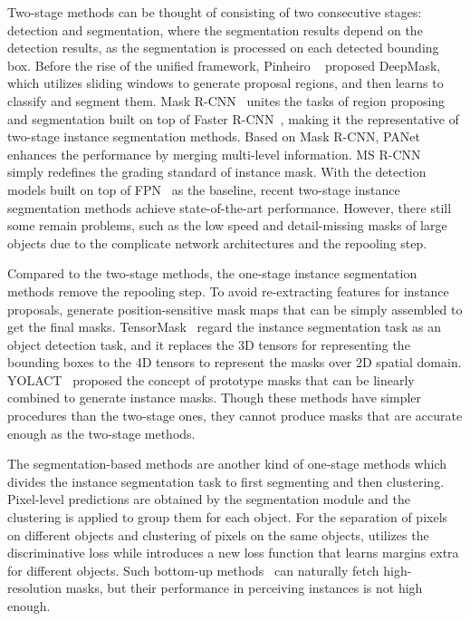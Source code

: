 \documentclass[10pt,twocolumn,letterpaper]{article}
\begin{document}
\medbreak
{} 
Two-stage methods can be thought of consisting of two consecutive stages: detection and segmentation, where the segmentation results depend on the detection results, as the segmentation is processed on each detected bounding box. 
Before the rise of the unified framework, Pinheiro \etal~\cite{pinheiro2015learning} proposed DeepMask, which utilizes sliding windows to generate proposal regions, and then learns to classify and segment them.
Mask R-CNN~\cite{he2017mask} unites the tasks of region proposing and segmentation built on top of Faster R-CNN~\cite{ren2015faster}, making it the representative of two-stage instance segmentation methods. 
Based on Mask R-CNN, PANet~\cite{liu2018path} enhances the performance by merging multi-level information. MS R-CNN~\cite{huang2019mask} simply redefines the grading standard of instance mask. 
With the detection models built on top of FPN~\cite{lin2017feature} as the baseline, recent two-stage instance segmentation methods achieve state-of-the-art performance. 
However, there still some remain problems, such as the low speed and detail-missing masks of large objects due to the complicate network architectures and the repooling step.

\medbreak
{}
Compared to the two-stage methods, the one-stage instance segmentation methods remove the repooling step. 
To avoid re-extracting features for instance proposals, \cite{dai2016instance_eccv,li2017fully} generate position-sensitive mask maps that can be simply assembled to get the final masks. 
TensorMask~\cite{chen2019tensormask} regard the instance segmentation task as an object detection task, and it replaces the 3D tensors for representing the bounding boxes to the 4D tensors to represent the masks over 2D spatial domain.
YOLACT~\cite{bolya-iccv2019} proposed the concept of prototype masks that can be linearly combined to generate instance masks. 
Though these methods have simpler procedures than the two-stage ones, they cannot produce masks that are accurate enough as the two-stage methods. 

\medbreak
{} 
The segmentation-based methods are another kind of one-stage methods which divides the instance segmentation task to first segmenting and then clustering. 
Pixel-level predictions are obtained by the segmentation module and the clustering is applied to group them for each object.
For the separation of pixels on different objects and clustering of pixels on the same objects, \cite{de2017semantic} utilizes the discriminative loss while \cite{neven2019instance} introduces a new loss function that learns margins extra for different objects. 
Such bottom-up methods~\cite{de2017semantic, fathi2017semantic, neven2019instance} can naturally fetch high-resolution masks, but their performance in perceiving instances is not high enough.
\end{document}

